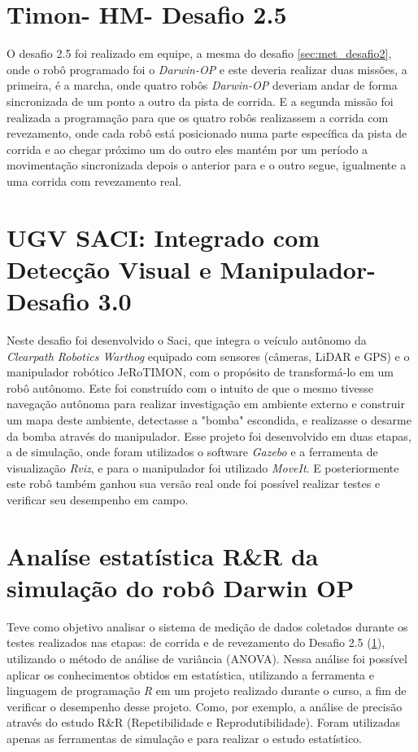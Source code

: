 \section{Timon- HM- Desafio 2.5}
\label{sec:met_desafio2_5}
O desafio 2.5 foi realizado em equipe, a mesma do desafio \ref{sec:met_desafio2}, onde o robô programado foi o \textit{Darwin-OP} e este deveria realizar duas missões, a primeira, é a marcha, onde quatro robôs \textit{Darwin-OP} deveriam andar de forma sincronizada de um ponto a outro da pista de corrida. E a segunda missão foi realizada a programação para que os quatro robôs realizassem a corrida com revezamento, onde cada robô está posicionado numa parte específica da pista de corrida e ao chegar próximo um do outro eles mantém por um período a movimentação sincronizada depois o anterior para e o outro segue, igualmente a uma corrida com revezamento real.


\section{UGV SACI: Integrado com Detecção Visual e Manipulador- Desafio 3.0}
\label{sec:met_desafio3}
Neste desafio foi desenvolvido o Saci, que integra o veículo autônomo da \textit{Clearpath Robotics Warthog} equipado com sensores (câmeras, LiDAR e GPS) e o manipulador robótico JeRoTIMON, com o propósito de transformá-lo em um robô autônomo. Este foi construído com o intuito de que o mesmo tivesse navegação autônoma para realizar investigação em ambiente externo e construir um mapa deste ambiente, detectasse a "bomba" escondida, e realizasse o desarme da bomba através do manipulador. 
Esse projeto foi desenvolvido em duas etapas, a de simulação, onde foram utilizados o software  \textit{Gazebo} e a ferramenta de visualização \textit{Rviz}, e para o manipulador foi utilizado \textit{MoveIt}. E posteriormente este robô também ganhou sua versão real onde foi possível realizar testes e verificar seu desempenho em campo.



\section{Analíse estatística R\&R da simulação do robô Darwin OP}
\label{sec:met_analise_darwin}
Teve como objetivo analisar o sistema de medição de dados coletados durante os testes realizados nas etapas: de corrida e de revezamento do Desafio 2.5 (\ref{sec:met_desafio2_5}), utilizando o método de análise de variância (ANOVA). Nessa análise foi possível aplicar os conhecimentos obtidos em estatística, utilizando a ferramenta e linguagem de programação \textit{R} em um projeto realizado durante o curso, a fim de verificar o desempenho desse projeto. Como, por exemplo, a análise de precisão através do estudo R\&R (Repetibilidade e Reprodutibilidade). Foram utilizadas apenas as ferramentas de simulação e para realizar o estudo estatístico.


